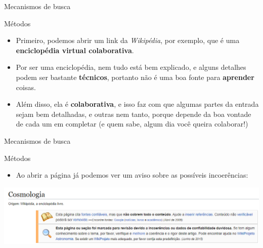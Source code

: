 \begin{frame}{Mecanismos de busca}
	\begin{block}{Métodos}
		\begin{itemize}
			\item Primeiro, podemos abrir um link da \textit{Wikipédia}, por exemplo, que é uma \textbf{enciclopédia virtual colaborativa}.
			\item Por ser uma enciclopédia, nem tudo está bem explicado, e alguns detalhes podem ser bastante \textbf{técnicos}, portanto não é uma boa fonte para \textbf{aprender} coisas.
			\item Além disso, ela é \textbf{colaborativa}, e isso faz com que algumas partes da entrada sejam bem detalhadas, e outras nem tanto, porque depende da boa vontade de cada um em completar (e quem sabe, algum dia você queira colaborar!)
		\end{itemize}
	\end{block}

\end{frame}


\begin{frame}{Mecanismos de busca}
	\begin{block}{Métodos}
		\begin{itemize}
			\item Ao abrir a página já podemos ver um aviso sobre as possíveis incoerências:
		\end{itemize}
	\end{block}

	\centering
	\includegraphics[width=1\linewidth]{Figuras/Ch03/fig7.6}
\end{frame}


